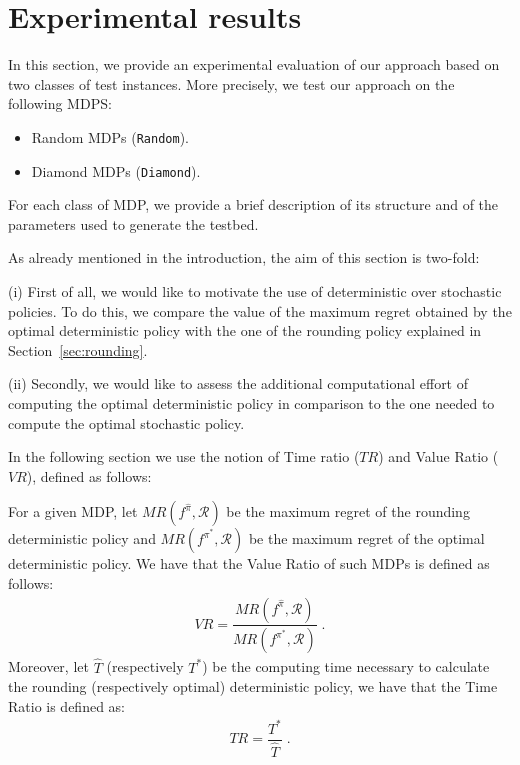 \section{Experimental results}\label{sec:experiments}

In this section, we provide an experimental evaluation of our approach
based on two classes of test instances. More precisely, we test our approach on the following MDPS:
\begin{itemize}
\item Random MDPs (\texttt{Random}).
\item Diamond MDPs (\texttt{Diamond}).
\end{itemize}


For each class of MDP, we provide a brief description of its structure and of the parameters used to generate the testbed.

As already mentioned in the introduction, the aim of this section is two-fold:

(i) First of all, we would like to motivate the use of deterministic over stochastic policies. To do this, we compare the value of the maximum regret obtained by the optimal deterministic policy with the one of the rounding policy explained in Section~\ref{sec:rounding}. 
%

(ii) Secondly, we would like to assess the additional computational effort of computing the optimal deterministic policy in comparison to the one needed to compute the optimal stochastic policy. 	 

In the following section we use the notion of Time ratio ($TR$) and Value Ratio ($VR$), defined as follows:

\begin{definition}
For a given MDP, let $MR(f^{\hat{\pi}}, \mathcal{R})$ be the maximum regret of the rounding deterministic policy and $MR(f^{\pi^*}, \mathcal{R})$  be the maximum regret of the optimal deterministic policy. We have that the Value Ratio of such MDPs is defined as follows:
\begin{align}
VR = \dfrac{MR(f^{\hat{\pi}}, \mathcal{R})}{MR(f^{\pi^*}, \mathcal{R})}\;.
\end{align} 
Moreover, let $\hat{T}$ (respectively $T^*$) be the computing time necessary to calculate the rounding (respectively optimal) deterministic policy, we have that the Time Ratio is defined as:
\begin{align}
TR=\dfrac{T^*}{\hat{T}}\;.
\end{align}
 
\end{definition}

